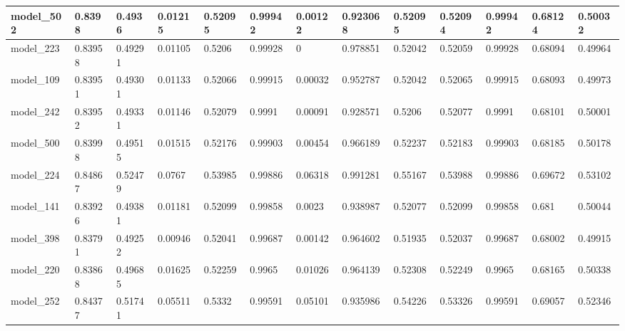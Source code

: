 \begin{tabular}{|l|l|l|l|l|l|l|l|l|l|l|l|l|}
model\_502     & 0.8398      & 0.4936         & 0.01215      & 0.52095          & 0.99942              & 0.00122              & 0.923068     & 0.52095           & 0.52094            & 0.99942         & 0.68124     & 0.50032      \\ \hline
model\_223     & 0.83958     & 0.49291        & 0.01105      & 0.5206           & 0.99928              & 0                    & 0.978851     & 0.52042           & 0.52059            & 0.99928         & 0.68094     & 0.49964      \\ \hline
model\_109     & 0.83951     & 0.49301        & 0.01133      & 0.52066          & 0.99915              & 0.00032              & 0.952787     & 0.52042           & 0.52065            & 0.99915         & 0.68093     & 0.49973      \\ \hline
model\_242     & 0.83952     & 0.49331        & 0.01146      & 0.52079          & 0.9991               & 0.00091              & 0.928571     & 0.5206            & 0.52077            & 0.9991          & 0.68101     & 0.50001      \\ \hline
model\_500     & 0.83998     & 0.49515        & 0.01515      & 0.52176          & 0.99903              & 0.00454              & 0.966189     & 0.52237           & 0.52183            & 0.99903         & 0.68185     & 0.50178      \\ \hline
model\_224     & 0.84867     & 0.52479        & 0.0767       & 0.53985          & 0.99886              & 0.06318              & 0.991281     & 0.55167           & 0.53988            & 0.99886         & 0.69672     & 0.53102      \\ \hline
model\_141     & 0.83926     & 0.49381        & 0.01181      & 0.52099          & 0.99858              & 0.0023               & 0.938987     & 0.52077           & 0.52099            & 0.99858         & 0.681       & 0.50044      \\ \hline
model\_398     & 0.83791     & 0.49252        & 0.00946      & 0.52041          & 0.99687              & 0.00142              & 0.964602     & 0.51935           & 0.52037            & 0.99687         & 0.68002     & 0.49915      \\ \hline
model\_220     & 0.83868     & 0.49685        & 0.01625      & 0.52259          & 0.9965               & 0.01026              & 0.964139     & 0.52308           & 0.52249            & 0.9965          & 0.68165     & 0.50338      \\ \hline
model\_252     & 0.84377     & 0.51741        & 0.05511      & 0.5332           & 0.99591              & 0.05101              & 0.935986     & 0.54226           & 0.53326            & 0.99591         & 0.69057     & 0.52346      \\ \hline

\end{tabular}
